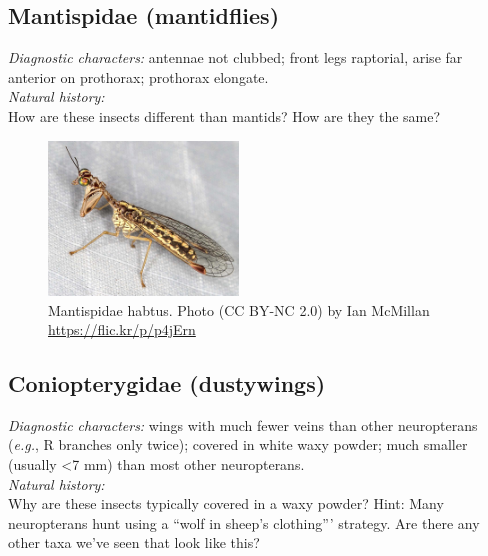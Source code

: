 \documentclass[letterpaper, 11pt]{article}
\begin{document}
\subsection{Mantispidae (mantidflies)}
\noindent{}\textit{Diagnostic characters:} antennae not clubbed; front legs raptorial, arise far anterior on prothorax; prothorax elongate.\\

\noindent{}\textit{Natural history:}\\

\noindent{}How are these insects different than mantids? How are they the same?\vspace{3cm}

\begin{figure}[ht!]
  \centering
    \includegraphics[width=0.45\textwidth]{MantispidHabitus}
  \caption{Mantispidae habtus. Photo (CC BY-NC 2.0) by Ian McMillan \url{https://flic.kr/p/p4jErn}}
  \label{fig:mantispid}
\end{figure}

\subsection{Coniopterygidae (dustywings)}
\noindent{}\textit{Diagnostic characters:} wings with much fewer veins than other neuropterans (\textit{e.g.}, R branches only twice); covered in white waxy powder; much smaller (usually \textless7 mm) than most other neuropterans.\\

\noindent{}\textit{Natural history:}\\

\noindent{}Why are these insects typically covered in a waxy powder? Hint: Many neuropterans hunt using a ``wolf in sheep's clothing''' strategy. Are there any other taxa we've seen that look like this? \vspace{3cm}
\end{document}
